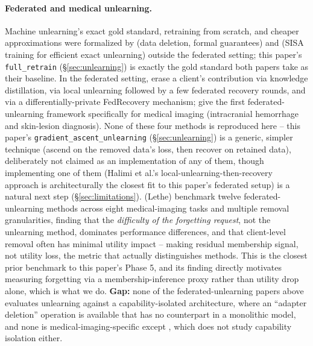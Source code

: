 \documentclass[11pt]{article}
\begin{document}
\paragraph{Federated and medical unlearning.} Machine unlearning's exact
gold standard, retraining from scratch, and cheaper approximations were
formalized by \citet{ginart2019making} (data deletion, formal guarantees)
and \citet{bourtoule2021machine} (SISA training for efficient exact
unlearning) outside the federated setting; this paper's
\texttt{full\_retrain} (\S\ref{sec:unlearning}) is exactly the gold
standard both papers take as their baseline. In the federated setting,
\citet{wu2022federated} erase a client's contribution via knowledge
distillation, \citet{halimi2022federated} via local unlearning followed by
a few federated recovery rounds, and \citet{zhang2023fedrecovery} via a
differentially-private FedRecovery mechanism; \citet{deng2024enable} give
the first federated-unlearning framework specifically for medical imaging
(intracranial hemorrhage and skin-lesion diagnosis). None of these four
methods is reproduced here -- this paper's
\texttt{gradient\_ascent\_unlearning} (\S\ref{sec:unlearning}) is a
generic, simpler technique (ascend on the removed data's loss, then
recover on retained data), deliberately not claimed as an implementation of
any of them, though implementing one of them (Halimi et al.'s
local-unlearning-then-recovery approach is architecturally the closest fit
to this paper's federated setup) is a natural next step
(\S\ref{sec:limitations}). \citet{chen2026lethe} (Lethe) benchmark twelve
federated-unlearning methods across eight medical-imaging tasks and
multiple removal granularities, finding that the \emph{difficulty of the
forgetting request}, not the unlearning method, dominates performance
differences, and that client-level removal often has minimal utility
impact -- making residual membership signal, not utility loss, the metric
that actually distinguishes methods. This is the closest prior benchmark to
this paper's Phase 5, and its finding directly motivates measuring
forgetting via a membership-inference proxy rather than utility drop
alone, which is what we do. \textbf{Gap:} none of the federated-unlearning
papers above evaluates unlearning against a capability-isolated
architecture, where an ``adapter deletion'' operation is available that has
no counterpart in a monolithic model, and none is medical-imaging-specific
except \citet{deng2024enable}, which does not study capability isolation
either.
\end{document}

